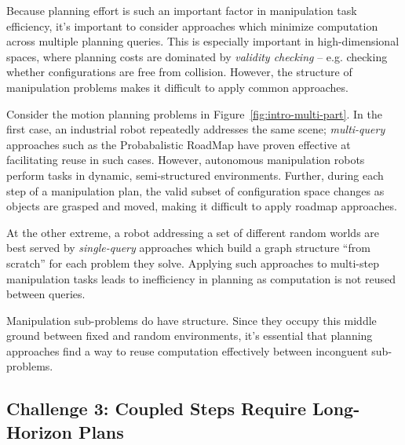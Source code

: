 Because planning effort is such an important factor in
manipulation task efficiency,
it's important to consider approaches which minimize computation
across multiple planning queries.
This is especially important in high-dimensional spaces,
where planning costs are dominated by \emph{validity checking} --
e.g. checking whether configurations are free from collision.
However, the structure of manipulation problems
makes it difficult to apply common approaches.

Consider the motion planning problems in
Figure~\ref{fig:intro-multi-part}.
In the first case,
an industrial robot repeatedly addresses the same scene;
\emph{multi-query} approaches such as the
Probabalistic RoadMap\cite{kavrakietal1996prm}
have proven effective at facilitating reuse in such cases.
However,
autonomous manipulation robots perform tasks
in dynamic, semi-structured environments.
Further,
during each step of a manipulation plan,
the valid subset of configuration space changes
as objects are grasped and moved,
making it difficult to apply roadmap approaches.

At the other extreme,
a robot addressing a set of different random worlds
are best served by \emph{single-query} approaches
which build a graph structure ``from scratch''
for each problem they solve.
Applying such approaches to multi-step manipulation tasks
leads to inefficiency in planning
as computation is not reused between queries.

Manipulation sub-problems do have structure.
Since they occupy this middle ground between
fixed and random environments,
it's essential that planning approaches
find a way to reuse computation effectively
between inconguent sub-problems.

\subsection*{Challenge 3: Coupled Steps Require Long-Horizon Plans}

